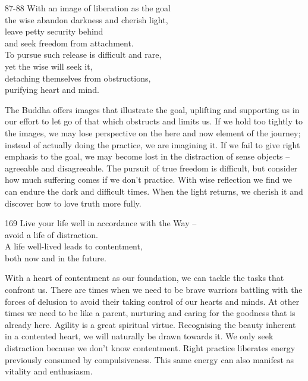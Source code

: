 

\begin{dhpVerse}{87-88}
\label{dhp-87}\label{dhp-88}
With an image of liberation as the goal\\
the wise abandon darkness and cherish light,\\
leave petty security behind\\
and seek freedom from attachment.\\
To pursue such release is difficult and rare,\\
yet the wise will seek it,\\
detaching themselves from obstructions,\\
purifying heart and mind.
\end{dhpVerse}

\begin{dhpRefl}

The Buddha offers images that illustrate the goal, uplifting and
supporting us in our effort to let go of that which obstructs and
limits us. If we hold too tightly to the images, we may lose
perspective on the here and now element of the journey; instead of
actually doing the practice, we are imagining it. If we fail to give
right emphasis to the goal, we may become lost in the distraction of
sense objects -- agreeable and disagreeable. The pursuit of true
freedom is difficult, but consider how much suffering comes if we
don't practice. With wise reflection we find we can endure the dark
and difficult times. When the light returns, we cherish it and
discover how to love truth more fully.

\end{dhpRefl}


\begin{dhpVerse}{169}
\label{dhp-169}
Live your life well in accordance with the Way --\\
avoid a life of distraction.\\
A life well-lived leads to contentment,\\
both now and in the future.
\end{dhpVerse}

\begin{dhpRefl}

With a heart of contentment as our foundation, we can tackle the
tasks that confront us. There are times when we need to be brave warriors
battling with the forces of delusion to avoid their taking control of
our hearts and minds. At other times we need to be like a parent,
nurturing and caring for the goodness that is already here. Agility
is a great spiritual virtue. Recognising the beauty inherent in a
contented heart, we will naturally be drawn towards it. We only seek
distraction because we don't know contentment. Right practice
liberates energy previously consumed by compulsiveness. This same
energy can also manifest as vitality and enthusiasm.

\end{dhpRefl}

